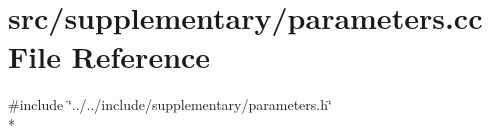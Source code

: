 \section{src/supplementary/parameters.cc File Reference}
\label{parameters_8cc}
{\ttfamily \#include \char`\"{}../../include/supplementary/parameters.\-h\char`\"{}}\\*
